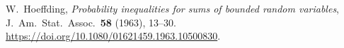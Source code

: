 
W.~Hoeffding, \emph{Probability inequalities for sums of bounded random
variables}, J.\ Am.\ Stat.\ Assoc.\ \textbf{58} (1963), 13--30.
\url{https://doi.org/10.1080/01621459.1963.10500830}.
